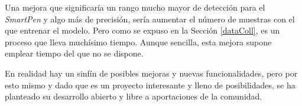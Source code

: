 Una mejora que significaría un rango mucho mayor de detección para el \textit{SmartPen}
y algo más de precisión, sería aumentar el número de muestras con el que
entrenar el modelo. Pero como se expuso en la Sección \ref{dataColl}, es un proceso
que lleva muchísimo tiempo. Aunque sencilla, esta mejora supone emplear tiempo
del que no se dispone.

En realidad hay un sinfín de posibles mejoras y nuevas funcionalidades,
pero por esto mismo y dado que es un proyecto interesante y lleno de
posibilidades, se ha planteado su desarrollo abierto y libre a aportaciones de
la comunidad.